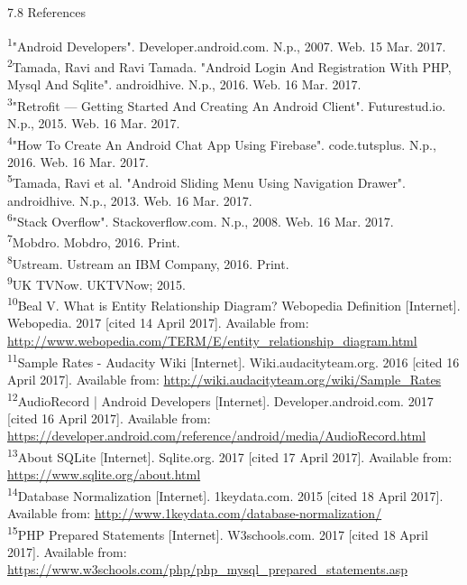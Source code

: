 \documentclass{article}
\begin{document}
\begin{flushleft}
{\Large 7.8 References}\par
\textsuperscript{1}"Android Developers". Developer.android.com. N.p., 2007. Web. 15 Mar. 2017.\\
\textsuperscript{2}Tamada, Ravi and Ravi Tamada. "Android Login And Registration With PHP, Mysql And Sqlite". androidhive. N.p., 2016. Web. 16 Mar. 2017.\\
\textsuperscript{3}"Retrofit — Getting Started And Creating An Android Client". Futurestud.io. N.p., 2015. Web. 16 Mar. 2017.\\
\textsuperscript{4}"How To Create An Android Chat App Using Firebase". code.tutsplus. N.p., 2016. Web. 16 Mar. 2017.\\
\textsuperscript{5}Tamada, Ravi et al. "Android Sliding Menu Using Navigation Drawer". androidhive. N.p., 2013. Web. 16 Mar. 2017.\\
\textsuperscript{6}"Stack Overflow". Stackoverflow.com. N.p., 2008. Web. 16 Mar. 2017.\\
\textsuperscript{7}Mobdro. Mobdro, 2016. Print.\\
\textsuperscript{8}Ustream. Ustream an IBM Company, 2016. Print.\\
\textsuperscript{9}UK TVNow. UKTVNow; 2015. \\
\textsuperscript{10}Beal V. What is Entity Relationship Diagram? Webopedia Definition [Internet]. Webopedia. 2017 [cited 14 April 2017]. Available from: \url {http://www.webopedia.com/TERM/E/entity_relationship_diagram.html}\\
\textsuperscript{11}Sample Rates - Audacity Wiki [Internet]. Wiki.audacityteam.org. 2016 [cited 16 April 2017]. Available from: \url{http://wiki.audacityteam.org/wiki/Sample_Rates}\\
\textsuperscript{12}AudioRecord | Android Developers [Internet]. Developer.android.com. 2017 [cited 16 April 2017]. Available from: \url{https://developer.android.com/reference/android/media/AudioRecord.html}\\
\textsuperscript{13}About SQLite [Internet]. Sqlite.org. 2017 [cited 17 April 2017]. Available from: \url{https://www.sqlite.org/about.html}\\
\textsuperscript{14}Database Normalization [Internet]. 1keydata.com. 2015 [cited 18 April 2017]. Available from: \url{http://www.1keydata.com/database-normalization/}\\
\textsuperscript{15}PHP Prepared Statements [Internet]. W3schools.com. 2017 [cited 18 April 2017]. Available from: \url{https://www.w3schools.com/php/php_mysql_prepared_statements.asp}\\

\end{flushleft}
\end{document}
